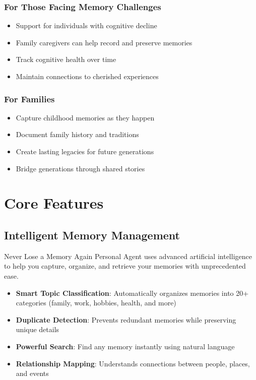 \documentclass[11pt,letterpaper]{article}
\begin{document}
\subsubsection{For Those Facing Memory Challenges}
\begin{itemize}[leftmargin=*]
    \item Support for individuals with cognitive decline
    \item Family caregivers can help record and preserve memories
    \item Track cognitive health over time
    \item Maintain connections to cherished experiences
\end{itemize}

\subsubsection{For Families}
\begin{itemize}[leftmargin=*]
    \item Capture childhood memories as they happen
    \item Document family history and traditions
    \item Create lasting legacies for future generations
    \item Bridge generations through shared stories
\end{itemize}

\newpage
\section{Core Features}

\subsection{Intelligent Memory Management}

\begin{featurebox}{Never Lose a Memory Again}
Personal Agent uses advanced artificial intelligence to help you capture, organize, and retrieve your memories with unprecedented ease.
\end{featurebox}

\begin{itemize}[leftmargin=*]
    \item \textbf{Smart Topic Classification}: Automatically organizes memories into 20+ categories (family, work, hobbies, health, and more)
    \item \textbf{Duplicate Detection}: Prevents redundant memories while preserving unique details
    \item \textbf{Powerful Search}: Find any memory instantly using natural language
    \item \textbf{Relationship Mapping}: Understands connections between people, places, and events
\end{itemize}
\end{document}
